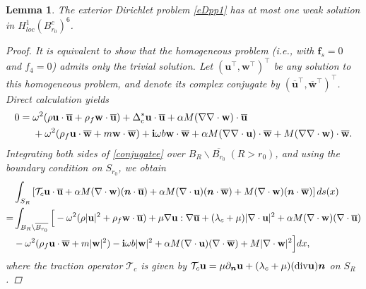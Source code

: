 \documentclass[11pt]{article}
\newcommand{\no}{\nonumber}
\newcommand{\ba}{\backslash}
\newcommand{\pa}{\partial}
\newcommand{\ov}{\overline}
\newcommand{\dive}{{\rm div}}
\newcommand{\la}{\lambda}
\newcommand{\bs}{\boldsymbol}
\newtheorem{lemma}[theorem]{Lemma}
\begin{document}
\begin{lemma}
The exterior Dirichlet problem \eqref{eDpp1} has at most one weak solution in $H_{loc}^1(B_{r_0}^c)^6$. 
\begin{proof}
It is equivalent to show that the homogeneous problem (i.e., with $\bs{f}_s = 0$ and $f_4 = 0$) admits 
only the trivial solution. Let $(\mathbf{u}^\top, \mathbf{w}^\top)^\top$ be any solution to this 
homogeneous problem, and denote its complex conjugate by $(\overline{\mathbf{u}}^\top, 
\overline{\mathbf{w}}^\top)^\top$. Direct calculation yields
\begin{equation}\label{conjugatee}
\begin{aligned}
0=\;&\omega^2(\rho\mathbf{u}\cdot \overline{\mathbf{u}} +\rho_f \mathbf{w}\cdot \overline{\mathbf{u}})
+\Delta_c^*\mathbf{u}\cdot \overline{\mathbf{u}}+\alpha M(\nabla \nabla \cdot  \mathbf{w})\cdot \overline{\mathbf{u}}\\
&+\omega^2(\rho_f \mathbf{u}\cdot \overline{\mathbf{w}}+m \mathbf{w}\cdot \overline{\mathbf{w}})
+{\bf{i}}\omega b \mathbf{w}\cdot \overline{\mathbf{w}}+\alpha M(\nabla \nabla \cdot  \mathbf{u})
\cdot \overline{\mathbf{w}}+ M(\nabla \nabla \cdot  \mathbf{w})\cdot \overline{\mathbf{w}}.  
\end{aligned} 
\end{equation}
Integrating both sides of \eqref{conjugatee} over $B_{R}\ba\ov{B_{r_0}}\;(R>r_0)$, and using the 
boundary condition on $S_{r_0}$, we obtain
\begin{align}\label{boundarye1}
&\int_{S_R}\left[\mathcal{T}_c\mathbf{u}\cdot\overline{\mathbf{u}} +\alpha M( \nabla \cdot 
\mathbf{w})(\bs{n}\cdot \overline{\mathbf{u}})+\alpha M(\nabla \cdot  \mathbf{u})(\bs{n} 
\cdot \overline{\mathbf{w}})+M( \nabla \cdot  \mathbf{w})(\bs{n}\cdot \overline{\mathbf{w}})\right]ds(x) \\\no
=&\int _{B_{R}\ba\ov{B_{r_0}}}\Big[-\omega^2(\rho|\mathbf{u}|^2 +\rho_f \mathbf{w}\cdot 
\overline{\mathbf{u}})+\mu\nabla\mathbf{u}:\nabla\overline{\mathbf{u}} +(\la_c+\mu)|\nabla 
\cdot \mathbf{u}|^2+\alpha M( \nabla \cdot  \mathbf{w})(\nabla\cdot \overline{\mathbf{u}})\\\no
&-\omega^2(\rho_f \mathbf{u}\cdot \overline{\mathbf{w}}+m |\mathbf{w}|^2)-{\bf{i}}\omega b 
|\mathbf{w}|^2+\alpha M(\nabla \cdot  \mathbf{u})(\nabla \cdot \overline{\mathbf{w}})+ 
M|\nabla \cdot  \mathbf{w}|^2\Big]dx,
\end{align}
where the traction operator $\mathcal{T}_c$ is given by $\mathcal{T}_c\mathbf{u}
=\mu\pa_{\bs{n}}\mathbf{u}+(\la_c+\mu)(\dive\mathbf{u})\bs{n}$ on $S_{R}$.

\end{proof}
\end{lemma}
\end{document}
